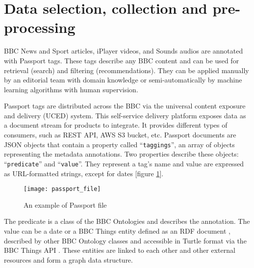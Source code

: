 
\section{Data selection, collection and pre-processing}

BBC News and Sport articles, iPlayer videos, and Sounds audios are annotated with Passport tags.
These tags describe any BBC content and can be used for retrieval (search) and filtering (recommendations).
They can be applied manually by an editorial team with domain knowledge
or semi-automatically by machine learning algorithms with human supervision.

Passport tags are distributed across the BBC via the universal content exposure and delivery (UCED) system.
This self-service delivery platform exposes data as a document stream for products to integrate.
It provides different types of consumers, such as REST API, AWS S3 bucket, etc.
Passport documents are JSON objects that contain a property called ``\verb|taggings|'', an array of objects representing the
metadata annotations. Two properties describe these objects: ``\verb|predicate|'' and ``\verb|value|''.
They represent a tag's name and value are expressed as URL-formatted strings, except for dates [figure \ref{fig:passport_file}].

\begin{figure}[h]
  \centering
  \texttt{[image: passport\_file]}
  \caption{An example of Passport file}
  \label{fig:passport_file}
\end{figure}

The predicate is a class of the BBC Ontologies \cite{BBC:Ontologies} and describes the annotation.
The value can be a date or a BBC Things entity \cite{BBC:Things,BBC:Things:About} defined as an RDF document \cite{W3C:RDF,W3C:RDF:Concepts},
described by other BBC Ontology classes and accessible in Turtle format \cite{W3C:Turtle} via the BBC Things API \cite{BBC:Things:API}.
These entities are linked to each other and other external resources and form a graph data structure.

